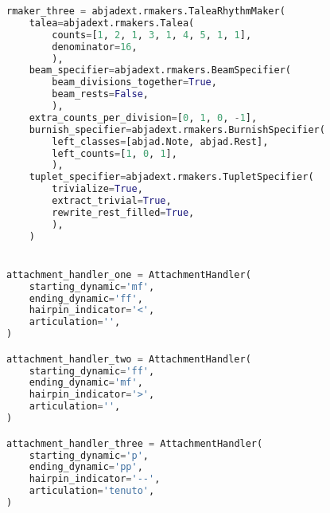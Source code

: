 \begin{lstlisting}[language=Python, caption=Tianshu Segment\_IV]
rmaker_three = abjadext.rmakers.TaleaRhythmMaker(
    talea=abjadext.rmakers.Talea(
        counts=[1, 2, 1, 3, 1, 4, 5, 1, 1],
        denominator=16,
        ),
    beam_specifier=abjadext.rmakers.BeamSpecifier(
        beam_divisions_together=True,
        beam_rests=False,
        ),
    extra_counts_per_division=[0, 1, 0, -1],
    burnish_specifier=abjadext.rmakers.BurnishSpecifier(
        left_classes=[abjad.Note, abjad.Rest],
        left_counts=[1, 0, 1],
        ),
    tuplet_specifier=abjadext.rmakers.TupletSpecifier(
        trivialize=True,
        extract_trivial=True,
        rewrite_rest_filled=True,
        ),
    )


attachment_handler_one = AttachmentHandler(
    starting_dynamic='mf',
    ending_dynamic='ff',
    hairpin_indicator='<',
    articulation='',
)

attachment_handler_two = AttachmentHandler(
    starting_dynamic='ff',
    ending_dynamic='mf',
    hairpin_indicator='>',
    articulation='',
)

attachment_handler_three = AttachmentHandler(
    starting_dynamic='p',
    ending_dynamic='pp',
    hairpin_indicator='--',
    articulation='tenuto',
)


\end{lstlisting}
